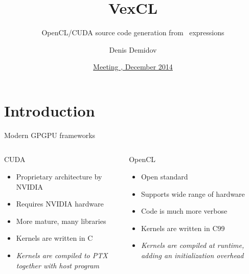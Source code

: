 \documentclass[@BEAMER_OPTIONS@]{beamer}
\title{VexCL}
\subtitle{OpenCL/CUDA source code generation from \CXX ~expressions}
\author{Denis Demidov}
\institute{
        Supercomputer Center of Russian Academy of Sciences
        \\ \vspace{\baselineskip}
        }
\date{
        \href{http://meetingcpp.com/index.php/schedule14.html}{Meeting \CXX, December 2014}
    }
\newcommand{\CXX}{{\rm C}\plusplus}
\newcommand{\CC}{{\rm C99}\xspace}
\begin{document}
\begin{frame}{}
    \titlepage
\end{frame}

\note{ }

\section{Introduction}
\begin{frame}{Modern GPGPU frameworks}
    \begin{columns}
        \begin{column}{0.45\textwidth}
            \begin{block}{CUDA}
                \begin{itemize}
                    \item Proprietary architecture by NVIDIA
                    \item Requires NVIDIA hardware
                    \item More mature, many libraries
                    \item Kernels are written in \CXX
                        \vspace{\baselineskip}
                    \item<2> \emph{Kernels are compiled to PTX together with
                        host program}
                \end{itemize}
            \end{block}
        \end{column}
        \begin{column}{0.45\textwidth}
            \begin{block}{OpenCL}
                \begin{itemize}
                    \item Open standard
                    \item Supports wide range of hardware
                    \item Code is much more verbose
                    \item Kernels are written in \CC
                        \vspace{\baselineskip}
                    \item<2> \emph{Kernels are compiled at runtime, adding an
                        initialization overhead}
                \end{itemize}

\end{block}
\end{column}
\end{columns}
\end{frame}
\end{document}
